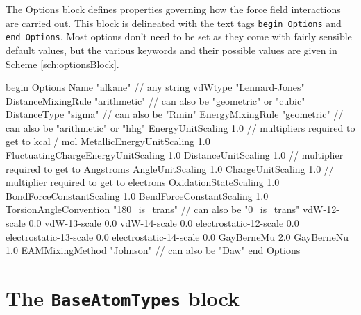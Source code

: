 \documentclass[letterpaper]{report}
\begin{document}
The Options block defines properties governing how the force field
interactions are carried out.  This block is delineated with the text
tags {\tt begin Options} and {\tt end Options}.  Most options don't
need to be set as they come with fairly sensible default values, but
the various keywords and their possible values are given in Scheme
\ref{sch:optionsBlock}. 

\begin{code}[caption={[A force field Options block showing default values
for many force field options.] A force field Options block showing default values
for many force field options.  Most of these options do not need to be
specified if the default values are working.},
label={sch:optionsBlock}] 
begin Options
 Name                      "alkane"       // any string
 vdWtype                   "Lennard-Jones" 
 DistanceMixingRule        "arithmetic"   // can also be "geometric" or "cubic"
 DistanceType              "sigma"        // can also be "Rmin"
 EnergyMixingRule          "geometric"    // can also be "arithmetic" or "hhg"
 EnergyUnitScaling         1.0            // multipliers required to get to kcal / mol
 MetallicEnergyUnitScaling 1.0            
 FluctuatingChargeEnergyUnitScaling  1.0
 DistanceUnitScaling       1.0            // multiplier required to get to Angstroms
 AngleUnitScaling          1.0
 ChargeUnitScaling         1.0            // multiplier required to get to electrons
 OxidationStateScaling     1.0
 BondForceConstantScaling  1.0
 BendForceConstantScaling  1.0
 TorsionAngleConvention    "180_is_trans" // can also be "0_is_trans"
 vdW-12-scale              0.0
 vdW-13-scale              0.0
 vdW-14-scale              0.0
 electrostatic-12-scale    0.0
 electrostatic-13-scale    0.0
 electrostatic-14-scale    0.0
 GayBerneMu                2.0
 GayBerneNu                1.0
 EAMMixingMethod           "Johnson"      // can also be "Daw"
end Options
\end{code}

\section{\label{section:ffBase}The {\tt BaseAtomTypes} block}
\end{document}
